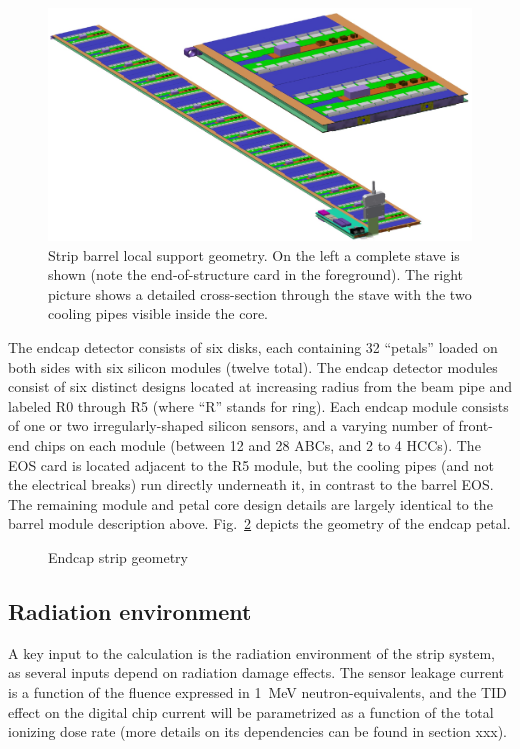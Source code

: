 \begin{figure}[ht]
\centering
\includegraphics[width=0.8\linewidth]{figures/stave.pdf}
\caption{Strip barrel local support geometry. On the left a complete stave is shown (note the end-of-structure card in the foreground). The right picture shows a detailed cross-section through the stave with the two cooling pipes visible inside the core. }
\label{fig:barrelgeometry}
\end{figure}

The endcap detector consists of six disks, each containing 32 ``petals'' loaded on
both sides with six silicon modules (twelve total).
The endcap detector modules consist of six distinct designs located at increasing radius from the
beam pipe and labeled R0 through R5 (where ``R'' stands for ring). Each endcap module consists of one
or two irregularly-shaped silicon sensors, and a varying number of front-end chips on each module
(between 12 and 28 ABCs, and 2 to 4 HCCs). The EOS card is located adjacent to the R5 module, but the
cooling pipes (and not the electrical breaks) run directly underneath it, in contrast to the barrel EOS.
The remaining module and petal core design details are largely identical to the barrel module description above.
Fig.~\ref{fig:endcapgeometry} depicts the geometry of the endcap petal.

\begin{figure}[ht]
\centering
\caption{Endcap strip geometry}
\label{fig:endcapgeometry}
\end{figure}

\subsection{Radiation environment}
A key input to the calculation is the radiation environment of the strip system, as several inputs depend on radiation damage effects. The sensor leakage current is a function of the fluence expressed in 1~MeV neutron-equivalents, and the TID effect on the digital chip current will be parametrized as a function of the total ionizing dose rate (more details on its dependencies can be found in section xxx). 

